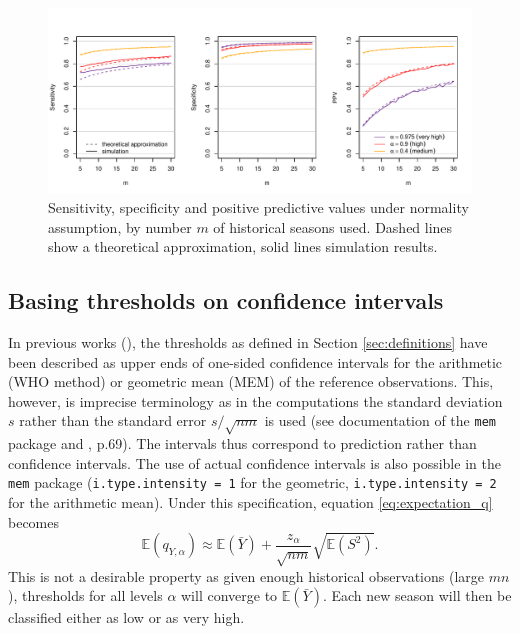 \documentclass{article}
\newcommand{\sd}{s}
\begin{document}
\begin{figure}
\begin{center}
\includegraphics[scale=0.75]{figure/analytical_sens_spec.pdf}
\end{center}

\vspace{-10mm}

\caption{Sensitivity, specificity and positive predictive values under normality assumption, by number $m$ of historical seasons used. Dashed lines show a theoretical approximation, solid lines simulation results.}
\label{fig:sens_spec_ana}
\end{figure}



\subsection{Basing thresholds on confidence intervals}
\label{subsec:cis}

In previous works (\citealt{WHO2014, Vega2015}), the thresholds as defined in Section \ref{sec:definitions} have been described as upper ends of one-sided confidence intervals for the arithmetic (WHO method) or geometric mean (MEM) of the reference observations. This, however, is imprecise terminology as in the computations the standard deviation $\sd$ rather than the standard error $\sd/\sqrt{nm}$ is used (see documentation of the \texttt{mem} package and \citealt{WHO2014}, p.69). The intervals thus correspond to prediction rather than confidence intervals. The use of actual confidence intervals is also possible in the \texttt{mem} package (\texttt{i.type.intensity = 1} for the geometric, \texttt{i.type.intensity = 2} for the arithmetic mean). Under this specification, equation \eqref{eq:expectation_q} becomes
$$
\mathbb{E}(q_{Y, \alpha}) \approx \mathbb{E}(\bar{Y}) + \frac{z_\alpha}{\sqrt{nm}} \sqrt{\mathbb{E}(S^2)}.
$$
This is not a desirable property as given enough historical observations (large $mn$), thresholds for all levels $\alpha$ will converge to $\mathbb{E}(\bar{Y})$. Each new season will then be classified either as low or as very high.
\end{document}
